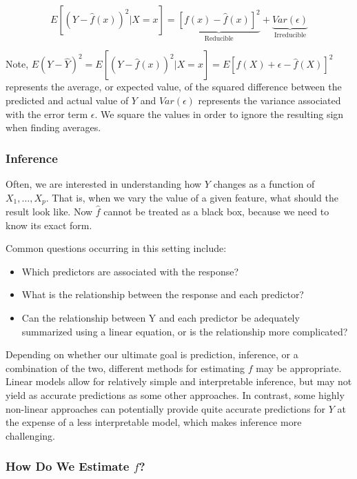 \documentclass{article}
\numberwithin{equation}{section}
\begin{document}
\begin{equation}
    E[(Y - \hat f (x))^2 | X = x] = \underbrace{[f(x) - \hat f(x)]^2}_{\text{Reducible}} + \underbrace{Var(\epsilon)}_{\text{Irreducible}} 
\end{equation}

Note, $E(Y - \hat Y)^2 = E[(Y - \hat f (x))^2 | X = x] = E[f(X) + \epsilon - \hat f(X)]^2$ represents the average, or expected value, of the squared difference between the predicted and actual value of $Y$ and $Var(\epsilon)$ represents the variance associated with the error term  $\epsilon$. We square the values in order to ignore the resulting sign when finding averages.


\subsubsection*{Inference}
Often, we are interested in understanding how $Y$ changes as a function of $X_1,\dots,X_p$. That is, when we vary the value of a given feature, what should the result look like. Now $\hat f$ cannot be treated as a black box, because we need to know its exact form.

Common questions occurring in this setting include:
\begin{itemize}
    \item Which predictors are associated with the response?
    \item What is the relationship between the response and each predictor?
    \item Can the relationship between Y and each predictor be adequately summarized using a linear equation, or is the relationship more complicated? 
\end{itemize}

Depending on whether our ultimate goal is prediction, inference, or a combination of the two, different methods for estimating $f$ may be appropriate. Linear models allow for relatively simple and interpretable inference, but may not yield as accurate predictions as some other approaches. In contrast, some highly non-linear approaches can potentially provide quite accurate predictions for $Y$ at the expense of a less interpretable model, which makes inference more challenging.

\subsubsection{How Do We Estimate \texorpdfstring{$f$}{f}?}
\end{document}
